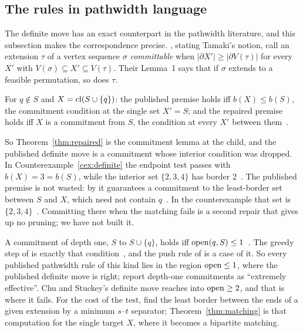 \subsection{The rules in pathwidth language}
\label{sec:layouts}

The definite move has an exact counterpart in the pathwidth literature, and
this subsection makes the correspondence precise.
\citet[p.~142]{Kitsunai2016}, stating Tamaki's notion, call an extension $\tau$
of a vertex sequence $\sigma$ \emph{committable} when
$|\partial X'|\ge|\partial V(\tau)|$ for every $X'$ with
$V(\sigma)\subseteq X'\subseteq V(\tau)$. Their Lemma~1 says that if $\sigma$
extends to a feasible permutation, so does $\tau$.

\begin{lemma}\label{lem:endpoint}
For $q\notin S$ and $X=\mathrm{cl}(S\cup\{q\})$: the published premise holds iff
$b(X)\le b(S)$, the commitment condition at the single set $X'=S$; and the
repaired premise holds iff $X$ is a commitment from $S$, the condition at every
$X'$ between them~.
\end{lemma}

So Theorem~\ref{thm:repaired} is the commitment lemma at the child, and the
published definite move is a commitment whose interior condition was dropped.
In Counterexample~\ref{cex:definite} the endpoint test passes with
$b(X)=3=b(S)$, while the interior set $\{2,3,4\}$ has border
2~. The published premise is not wasted: by
\citet[Lemma~10, Cor.~2, pp.~148--149]{Kitsunai2016} it guarantees a
commitment to the least-border set between $S$ and $X$, which need not contain
$q$~. In the counterexample that set is
$\{2,3,4\}$~. Committing there when the matching fails is a
second repair that gives up no pruning; we have not built it.

A commitment of depth one, $S$ to $S\cup\{q\}$, holds iff
$\mathrm{open}(q,S)\le1$~. The greedy step of
\citet[Lemma~3, p.~49]{CoudertMazauricNisse2014} is exactly that
condition~, and the push rule of
\citet[Rule~1, p.~330]{SuchanVillanger2009} is a case of it. So every published
pathwidth rule of this kind lies in the region $\mathrm{open}\le1$, where the published
definite move is right; \citet[p.~388, Table~2]{KobayashiKomuroTamaki2014}
report depth-one commitments as ``extremely effective''. Chu and Stuckey's
definite move reaches into $\mathrm{open}\ge2$, and that is where it fails. For the
cost of the test, \citet[Cor.~2]{Kitsunai2016} find the least border between
the ends of a given extension by a minimum $s$--$t$ separator;
Theorem~\ref{thm:matching} is that computation for the single target $X$, where
it becomes a bipartite matching.

